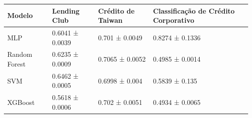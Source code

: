 \begin{tabular}{llll}
\toprule
Modelo & Lending Club & Crédito de Taiwan & Classificação de Crédito Corporativo \\
\midrule
MLP & 0.6041 ± 0.0039 & 0.701 ± 0.0049 & 0.8274 ± 0.1336 \\
Random Forest & 0.6235 ± 0.0009 & 0.7065 ± 0.0052 & 0.4985 ± 0.0014 \\
SVM & 0.6462 ± 0.0005 & 0.6998 ± 0.004 & 0.5839 ± 0.135 \\
XGBoost & 0.5618 ± 0.0006 & 0.702 ± 0.0051 & 0.4934 ± 0.0065 \\
\bottomrule
\end{tabular}
